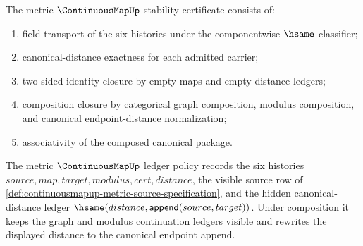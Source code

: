 \begin{definition}
\label{def:continuousmapup-metric-stability-certificate}
The metric $\ContinuousMapUp$ stability certificate consists of:
\begin{enumerate}
  \item field transport of the six histories under the componentwise
  $\hsame$ classifier;
  \item canonical-distance exactness for each admitted carrier;
  \item two-sided identity closure by empty maps and empty distance ledgers;
  \item composition closure by categorical graph composition, modulus
  composition, and canonical endpoint-distance normalization;
  \item associativity of the composed canonical package.
\end{enumerate}
\end{definition}

\begin{definition}
\label{def:continuousmapup-metric-ledger-policy}
The metric $\ContinuousMapUp$ ledger policy records the six histories
$source,map,target,modulus,cert,distance$, the visible source row of
\autoref{def:continuousmapup-metric-source-specification}, and the hidden
canonical-distance ledger
$\hsame(distance,\mathsf{append}(source,target))$. Under composition it keeps
the graph and modulus continuation ledgers visible and rewrites the displayed
distance to the canonical endpoint append.
\end{definition}

